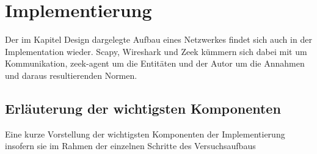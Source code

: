 \chapter{Implementierung}%
\label{cha:implementation}





Der im Kapitel Design dargelegte Aufbau eines Netzwerkes findet sich auch in der Implementation wieder. Scapy, Wireshark und Zeek kümmern sich dabei mit um Kommunikation, zeek-agent um die Entitäten und der Autor um die Annahmen und daraus resultierenden Normen.
\section{Erläuterung der wichtigsten Komponenten}
Eine kurze Vorstellung der wichtigsten Komponenten der Implementierung insofern sie im Rahmen der einzelnen Schritte des Versuchsaufbaus
